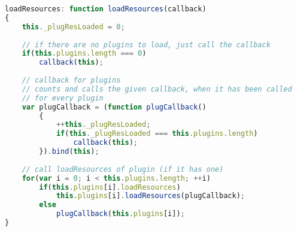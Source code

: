 \begin{lstlisting}[language=JavaScript, caption=\textprog{loadResources}-Methode von \textprog{BaseGameObject}]
loadResources: function loadResources(callback)
{
	this._plugResLoaded = 0;
	
	// if there are no plugins to load, just call the callback
	if(this.plugins.length === 0)
		callback(this);
	
	// callback for plugins
	// counts and calls the given callback, when it has been called
	// for every plugin
	var plugCallback = (function plugCallback()
		{
			++this._plugResLoaded;
			if(this._plugResLoaded === this.plugins.length)
				callback(this);
		}).bind(this);
	
	// call loadResources of plugin (if it has one)
	for(var i = 0; i < this.plugins.length; ++i)
		if(this.plugins[i].loadResources)
			this.plugins[i].loadResources(plugCallback);
		else
			plugCallback(this.plugins[i]);
}
\end{lstlisting}